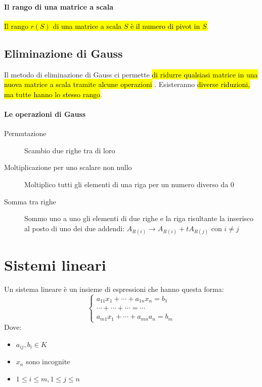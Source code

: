\documentclass[a4paper,12pt,oneside]{article}
\begin{document}
\paragraph{Il rango di una matrice a scala} \hl{Il rango $r(S)$ di una matrice
a scala $S$ è il numero di pivot in $S$}.

\subsection{Eliminazione di Gauss}
Il metodo di eliminazione di Gauss ci permette \hl{di ridurre qualsiasi matrice
in una nuova matrice a scala tramite alcune operazioni }. Esisteranno \hl{diverse
riduzioni, ma tutte hanno lo stesso rango}.

\paragraph{Le operazioni di Gauss}
\begin{description}
    \item[Permutazione] Scambio due righe tra di loro
    \item[Moltiplicazione per uno scalare non nullo] Moltiplico tutti gli elementi
        di una riga per un numero diverso da $0$
    \item[Somma tra righe] Sommo uno a uno gli elementi di due righe e la riga
        risultante la inserisco al posto di uno dei due addendi:
        $A_{R(i)} \to A_{R(i)} + tA_{R(j)} \text{ con } i \neq j$
\end{description}

\section{Sistemi lineari}
Un sistema lineare è un insieme di espressioni che hanno questa forma:
\[
    \begin{cases}
        a_{11}x_1 + \cdots + a_{1n}x_n = b_1 \\
        \cdots + \cdots + \cdots = \cdots \\
        a_{m1}x_1 + \cdots + a_{mn}a_n = b_m
    \end{cases}
\]
Dove:
\begin{itemize}
    \item $a_{ij}, b_i \in K$
    \item $x_n$ sono incognite
    \item $1 \leq i \leq m, 1 \leq j \leq n$
\end{itemize}
\end{document}
